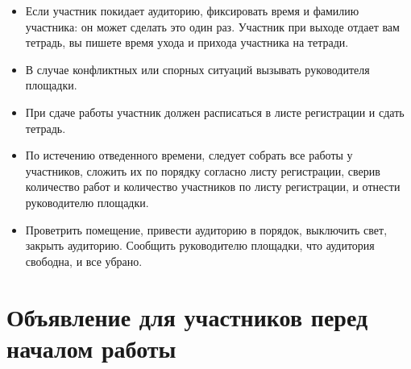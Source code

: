 \documentclass[a4paper,12pt]{article}
\begin{document}
\begin{itemize}
	\item Если участник покидает аудиторию, фиксировать время и фамилию участника: он может сделать это один раз. Участник при выходе отдает вам тетрадь, вы пишете время ухода и прихода участника на тетради.
	\item В случае конфликтных или спорных ситуаций вызывать руководителя площадки.
	\item При сдаче работы участник должен расписаться в листе регистрации и сдать тетрадь.
	\item По истечению отведенного времени, следует собрать все работы у участников, сложить их по порядку согласно листу регистрации, сверив количество работ и количество участников по листу регистрации, и отнести руководителю площадки.
	\item Проветрить помещение, привести аудиторию в порядок, выключить свет, закрыть аудиторию. Сообщить руководителю площадки, что аудитория свободна, и все убрано. 
\end{itemize}

\section{Объявление для участников перед началом работы}
\end{document}
